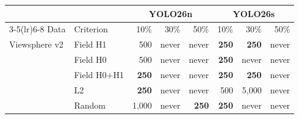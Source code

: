 \begin{tabular}{llrrrrrr}
\toprule
 & & \multicolumn{3}{c}{YOLO26n} & \multicolumn{3}{c}{YOLO26s} \\
\cmidrule(lr){3-5}\cmidrule(lr){6-8}
Data & Criterion & 10\% & 30\% & 50\% & 10\% & 30\% & 50\% \\
\midrule
Viewsphere v2 & Field H1 & 500 & never & never & \textbf{250} & \textbf{250} & never \\
 & Field H0 & 500 & never & never & \textbf{250} & never & never \\
 & Field H0+H1 & \textbf{250} & never & never & \textbf{250} & \textbf{250} & never \\
 & L2 & \textbf{250} & never & never & 500 & 5,000 & never \\
 & Random & 1,000 & never & \textbf{250} & \textbf{250} & never & never \\
\bottomrule
\end{tabular}
